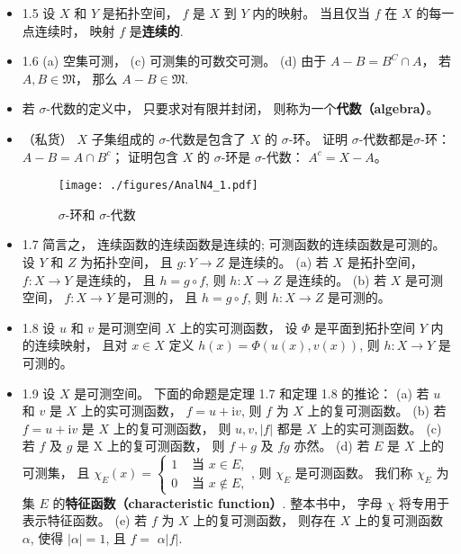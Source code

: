 \begin{itemize}
\item 1.5 设 $X$ 和 $Y$ 是拓扑空间， $f$ 是 $X$ 到 $Y$ 内的映射。 当且仅当 $f$ 在 $X$ 的每一点连续时， 映射 $f$ 是\textbf{连续的}.

\item 1.6 (a) 空集可测， (c) 可测集的可数交可测。 (d) 由于 $A-B = B^C\cap A$， 若 $A,B \in \mathfrak{M}$， 那么 $A-B\in \mathfrak{M}$.

\item 若 $\sigma$-代数的定义中， 只要求对有限并封闭， 则称为一个\textbf{代数（algebra）}。

\item （私货） $X$ 子集组成的 $\sigma$-代数是包含了 $X$ 的 $\sigma$-环。 证明 $\sigma$-代数都是$\sigma$-环： $A-B = A\cap B^c$； 证明包含 $X$ 的 $\sigma$-环是 $\sigma$-代数： $A^c = X-A$。

\begin{figure}[ht]
\centering
\texttt{[image: ./figures/AnalN4\_1.pdf]}
\caption{$\sigma$-环和 $\sigma$-代数} \label{AnalN4_fig1}
\end{figure}

\item 1.7 简言之， 连续函数的连续函数是连续的; 可测函数的连续函数是可测的。 设 $Y$ 和 $Z$ 为拓扑空间， 且 $g: Y \rightarrow Z$ 是连续的。 (a) 若 $X$ 是拓扑空间， $f: X \rightarrow Y$ 是连续的， 且 $h=g \circ f$, 则 $h: X \rightarrow Z$ 是连续的。 (b) 若 $X$ 是可测空间， $f: X \rightarrow Y$ 是可测的， 且 $h=g \circ f$, 则 $h: X \rightarrow Z$ 是可测的。 

\item 1.8 设 $u$ 和 $v$ 是可测空间 $X$ 上的实可测函数， 设 $\Phi$ 是平面到拓扑空间 $Y$ 内的连续映射， 且对 $x \in X$ 定义 $h(x)=\Phi(u(x), v(x))$, 则 $h: X \rightarrow Y$ 是可测的。

\item 1.9 设 $X$ 是可测空间。 下面的命题是定理 1.7 和定理 1.8 的推论：
(a) 若 $u$ 和 $v$ 是 $X$ 上的实可测函数， $f=u+\mathrm{i} v$, 则 $f$ 为 $X$ 上的复可测函数。 
(b) 若 $f=u+\mathrm{i} v$ 是 $X$ 上的复可测函数， 则 $u, v,|f|$ 都是 $X$ 上的实可测函数。 
(c) 若 $f$ 及 $g$ 是 $\mathrm{X}$ 上的复可测函数， 则 $f+g$ 及 $f g$ 亦然。
(d) 若 $E$ 是 $X$ 上的可测集， 且 $\chi_{E}(x)= \begin{cases}1 & \text { 当 } x \in E, \\ 0 & \text { 当 } x \notin E,\end{cases}$, 则 $\chi_{E}$ 是可测函数。 我们称 $\chi_{E}$ 为集 $E$ 的\textbf{特征函数（characteristic function）}. 整本书中， 字母 $\chi$ 将专用于表示特征函数。
(e) 若 $f$ 为 $X$ 上的复可测函数， 则存在 $X$ 上的复可测函数 $\alpha$, 使得 $|\alpha|=1$, 且 $f=$ $\alpha|f|$.


\end{itemize}
